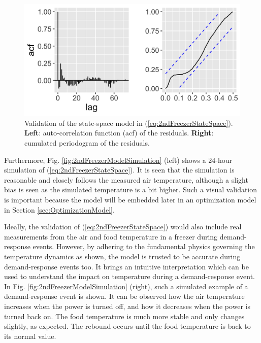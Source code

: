 \begin{figure}[!t]
    \centering
    \includegraphics[width=\columnwidth]{../figures/2ndFreezerModelValidation.png}
    \caption{ Validation of the state-space model in (\ref{eq:2ndFreezerStateSpace}). \textbf{Left}: auto-correlation function (acf) of the  residuals. \textbf{Right}: cumulated periodogram of the residuals.}
    \label{fig:2ndFreezerModelValidation}
    \vspace{-1mm}
\end{figure}



Furthermore, Fig. \ref{fig:2ndFreezerModelSimulation} (left) shows a 24-hour simulation of  (\ref{eq:2ndFreezerStateSpace}). It is seen that the simulation is  reasonable and closely follows the measured air temperature, although a slight bias is seen as the simulated temperature is a bit higher. Such a visual validation is important because the model will be embedded later in an optimization model in Section \ref{sec:OptimizationModel}.

Ideally, the validation of (\ref{eq:2ndFreezerStateSpace}) would also include real measurements from the air and food temperature in a freezer during demand-response events. However, by adhering to the fundamental physics governing the temperature dynamics as shown, the model is trusted to be accurate during demand-response events too. It brings an intuitive interpretation which can be used to understand the impact on temperature during a demand-response event.
In Fig. \ref{fig:2ndFreezerModelSimulation} (right), such a simulated example of a demand-response event is shown. It can be observed how the air temperature increases when the power is turned off, and how it decreases when the power is turned back on. The food temperature is much more stable and only changes slightly, as expected. The rebound occurs until the food temperature is back to its normal value.

